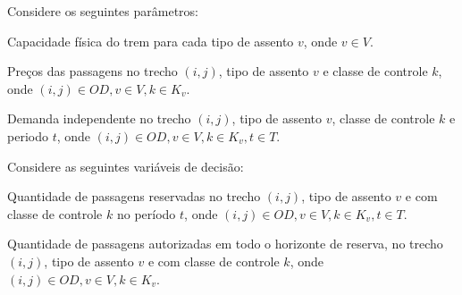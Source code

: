 Considere os seguintes parâmetros:
\begin{description}[style=unboxed, leftmargin=2.5cm, labelindent=1.5cm]
	\setlength{\itemsep}{-2.2em} %
	\setlength{\parskip}{0em} %
	\item[$Q_v:$] Capacidade física do trem para cada tipo de assento $v$, onde $v \in V$. \\
	\item[$P_{ijvk}:$] Preços  das passagens no trecho $(i,j)$, tipo de assento $v$ e classe de controle $k$, onde $(i,j) \in OD,v \in V, k \in K_v$.  \\
	\item[$d_{ijvkt}:$] Demanda independente no trecho $(i,j)$, tipo de assento $v$, classe de controle $k$ e periodo $t$, onde $(i,j) \in OD,v \in V, k \in K_v, t \in T$.
\end{description}

Considere as seguintes variáveis de decisão:
\begin{description}[style=unboxed, leftmargin=2.5cm, labelindent=1.5cm]
	\setlength{\itemsep}{-2.2em} %
	\setlength{\parskip}{0em} %
	\item[$X_{ijvkt}:$] Quantidade de passagens reservadas no trecho $(i,j)$, tipo de assento $v$ e com classe de controle $k$ no período $t$, onde $(i,j) \in OD, v \in V, k \in K_v, t \in T$.  \\
	\item[$Y_{ijvk}:$] Quantidade de passagens autorizadas em todo o horizonte de reserva, no trecho $(i,j)$, tipo de assento $v$ e com classe de controle $k$, onde $(i,j) \in OD, v \in V, k \in K_v$.
\end{description}

